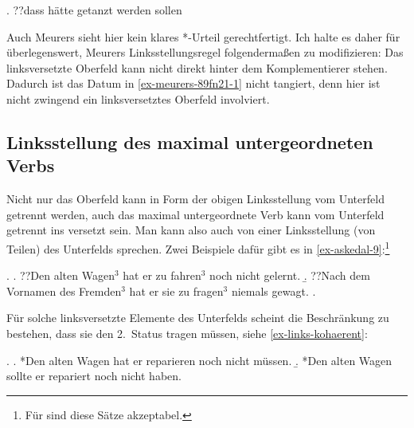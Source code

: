 \ex. \label{ex-meurers-89fn21-1} ??dass hätte getanzt werden sollen \hfill \citep[89, Fußnote 21]{Meurers:99}

Auch Meurers sieht hier kein klares *-Urteil gerechtfertigt. Ich halte es daher für überlegenswert, Meurers Linksstellungsregel folgenderma\ss en zu modifizieren: Das  linksversetzte Oberfeld kann nicht direkt hinter dem Komplementierer stehen. Dadurch ist das Datum in \ref{ex-meurers-89fn21-1} nicht tangiert, denn hier ist nicht zwingend ein linksversetztes Oberfeld involviert. 


\subsection{Linksstellung des maximal untergeordneten Verbs}

Nicht nur das Oberfeld kann in Form der obigen Linksstellung vom Unterfeld getrennt werden, auch das maximal untergeordnete Verb kann vom Unterfeld getrennt ins  versetzt sein. Man kann also auch von einer Linksstellung (von Teilen) des Unterfelds sprechen. Zwei Beispiele dafür gibt es  in \ref{ex-askedal-9}:\footnote{Für \citet[238]{Meurers:99} sind diese Sätze akzeptabel.}\largerpage[-1]%

\ex. \label{ex-askedal-9}
\a. ??Den alten Wagen$^3$ hat er zu fahren$^3$ noch nicht gelernt.
\b. ??Nach dem Vornamen des Fremden$^3$ hat er sie zu fragen$^3$ niemals gewagt.
\z. \citep[(9)]{Askedal:83}

Für solche linksversetzte Elemente des Unterfelds scheint die Beschränkung zu bestehen, dass sie den 2.~Status tragen müssen, siehe \ref{ex-links-kohaerent}: 

\ex. \label{ex-links-kohaerent}
\a. *Den alten Wagen hat er reparieren noch nicht müssen. 
\b. *Den alten Wagen sollte er repariert noch nicht haben. 

